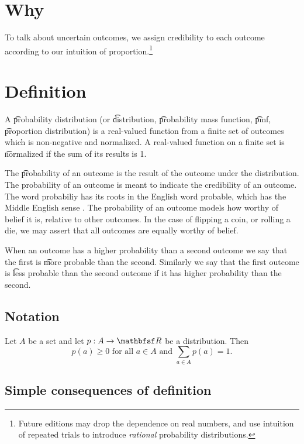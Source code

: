 

\section*{Why}

To talk about uncertain outcomes, we assign credibility to each outcome according to our intuition of proportion.\footnote{Future editions may drop the dependence on real numbers, and use intuition of repeated trials to introduce \textit{rational} probability distributions.}

\section*{Definition}

A \t{probability distribution} (or \t{distribution}, \t{probability mass function}, \t{pmf}, \t{proportion distribution}) is a real-valued function from a finite set of outcomes which is non-negative and normalized.
A real-valued function on a finite set is \t{normalized} if the sum of its results is 1.

The \t{probability of an outcome} is the result of the outcome under the distribution.
The probability of an outcome is meant to indicate the credibility of an outcome.
The word probabiliy has its roots in the English word probable, which has the Middle English sense .
The probability of an outcome models how worthy of belief it is, relative to other outcomes.
In the case of flipping a coin, or rolling a die, we may assert that all outcomes are equally worthy of belief.

When an outcome has a higher probability than a second outcome we say that the first is \t{more probable} than the second.
Similarly we say that the first outcome is \t{less probable} than the second outcome if it has higher probability than the second.

\subsection*{Notation}

Let $A$ be a set and let $p: A \to \R $ be a distribution.
Then
    \[
\textstyle
p(a) \geq 0 \text{ for all } a \in A \text{ and } \sum_{a \in A} p(a) = 1.
    \]

\subsection*{Simple consequences of definition}

